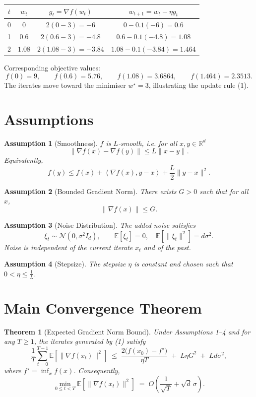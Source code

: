 \documentclass{article}
\newtheorem{theorem}{Theorem}
\newtheorem{assumption}{Assumption}
\newcommand{\E}{\mathbb{E}}
\newcommand{\R}{\mathbb{R}}
\newcommand{\ip}[2]{\left\langle #1,#2\right\rangle}
\begin{document}
\begin{center}
\begin{tabular}{c|c|c|c}
$t$ & $w_{t}$ & $g_{t}= \nabla f(w_{t})$ & $w_{t+1}=w_{t}-\eta g_{t}$ \\ \hline
0 & $0$   & $2(0-3)=-6$          & $0-0.1(-6)=0.6$\\
1 & $0.6$ & $2(0.6-3)=-4.8$      & $0.6-0.1(-4.8)=1.08$\\
2 & $1.08$& $2(1.08-3)=-3.84$    & $1.08-0.1(-3.84)=1.464$\\
\end{tabular}
\end{center}
Corresponding objective values:
\[
f(0)=9,\qquad f(0.6)=5.76,\qquad f(1.08)=3.6864,\qquad f(1.464)=2.3513.
\]
The iterates move toward the minimiser $w^{\star}=3$, illustrating the update rule (1).

\newpage

\section*{Assumptions}
\begin{assumption}[Smoothness]
$f$ is $L$‑smooth, i.e. for all $x,y\in\R^{d}$
\[
\|\nabla f(x)-\nabla f(y)\|\le L\|x-y\|.
\tag{2}
\]
Equivalently,
\[
f(y)\le f(x)+\ip{\nabla f(x)}{y-x}+\frac{L}{2}\|y-x\|^{2}.
\tag{3}
\]
\end{assumption}
\begin{assumption}[Bounded Gradient Norm]
There exists $G>0$ such that for all $x$,
\[
\|\nabla f(x)\|\le G.
\tag{4}
\]
\end{assumption}
\begin{assumption}[Noise Distribution]
The added noise satisfies
\[
\xi_{t}\sim\mathcal{N}(0,\sigma^{2}I_{d}),\qquad 
\E[\xi_{t}]=0,\quad \E[\|\xi_{t}\|^{2}]=d\sigma^{2}.
\tag{5}
\]
Noise is independent of the current iterate $x_{t}$ and of the past.
\end{assumption}
\begin{assumption}[Stepsize]
The stepsize $\eta$ is constant and chosen such that $0<\eta\le \frac{1}{L}$.
\end{assumption}

\section*{Main Convergence Theorem}
\begin{theorem}[Expected Gradient Norm Bound]\label{thm:main}
Under Assumptions 1–4 and for any $T\ge 1$, the iterates generated by (1) satisfy
\[
\frac{1}{T}\sum_{t=0}^{T-1}\E\!\left[\|\nabla f(x_{t})\|^{2}\right]
\;\le\;
\frac{2\bigl(f(x_{0})-f^{\star}\bigr)}{\eta T}
\;+\;
L\eta G^{2}
\;+\;
L d\sigma^{2},
\tag{7}
\]
where $f^{\star}= \inf_{x}f(x)$. Consequently,
\[
\min_{0\le t<T}\E\!\left[\|\nabla f(x_{t})\|^{2}\right]
\;=\;
O\!\left(\frac{1}{\sqrt{T}}+\sqrt{d}\,\sigma\right).
\]
\end{theorem}
\end{document}
